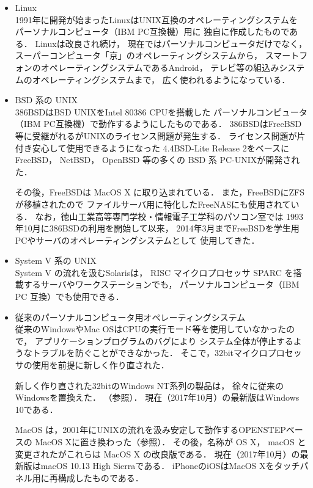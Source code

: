 \begin{enumerate}
\begin{itemize}
\item Linux \\
1991年に開発が始まったLinuxはUNIX互換のオペレーティングシステムを
パーソナルコンピュータ（IBM PC互換機）用に
独自に作成したものである\cite{linux}．
Linuxは改良され続け，
現在ではパーソナルコンピュータだけでなく，
スーパーコンピュータ「京」のオペレーティングシステム\cite{kei}から，
スマートフォンのオペレーティングシステムであるAndroid\cite{android}，
テレビ等の組込みシステムのオペレーティングシステムまで，
広く使われるようになっている．

\item BSD 系の UNIX \\
386BSD\cite{386bsd}はBSD UNIXをIntel 80386 CPUを搭載した
パーソナルコンピュータ（IBM PC互換機）で動作するようにしたものである．
386BSDはFreeBSD等に受継がれるがUNIXのライセンス問題が発生する\cite{unix}．
ライセンス問題が片付き安心して使用できるようになった
4.4BSD-Lite Release 2\cite{unix}をベースに
FreeBSD， NetBSD， OpenBSD 等の多くの BSD 系 PC-UNIXが開発された．

その後，FreeBSDは MacOS X に取り込まれている．
また，FreeBSDにZFSが移植された\cite{zfs}ので
ファイルサーバ用に特化したFreeNAS\cite{freenas}にも使用されている．
なお，徳山工業高等専門学校・情報電子工学科のパソコン室では
1993年10月に386BSDの利用を開始して以来，
2014年3月までFreeBSDを学生用PCやサーバのオペレーティングシステムとして
使用してきた\cite{iebsd}．

\item System V 系の UNIX \\
System V の流れを汲むSolaris\cite{solaris}は，
RISC マイクロプロセッサ SPARC を搭載するサーバやワークステーションでも，
パーソナルコンピュータ（IBM PC 互換）でも使用できる．

\item 従来のパーソナルコンピュータ用オペレーティングシステム \\
従来のWindowsやMac OSはCPUの実行モード等を使用していなかったので，
アプリケーションプログラムのバグにより
システム全体が停止するようなトラブルを防ぐことができなかった．
そこで，32bitマイクロプロセッサの使用を前提に新しく作り直された．

新しく作り直された32bitのWindows NT系列の製品は，
徐々に従来のWindowsを置換えた．
（参照）．
現在（2017年10月）の最新版はWindows 10である．

MacOS は，2001年にUNIXの流れを汲み安定して動作するOPENSTEPベースの
MacOS X\cite{macos}に置き換わった（参照）．
その後，名称が OS X， macOS と変更されたがこれらは MacOS X の改良版である．
現在（2017年10月）の最新版はmacOS 10.13 High Sierraである．
iPhoneのiOSはMacOS Xをタッチパネル用に再構成したものである\cite{ios}．
\end{itemize}
\end{enumerate}

